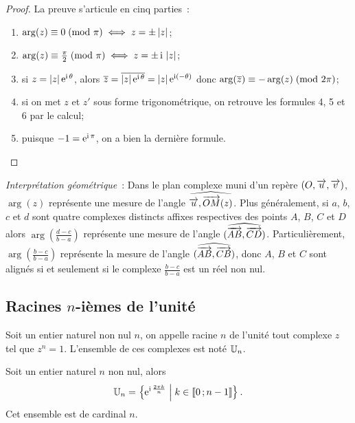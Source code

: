 \begin{proof}
  La preuve s'articule en cinq parties~:
  \begin{enumerate}
    \item \(\arg(z) \equiv 0\!\pmod {\pi} \iff z = \pm \left\lvert z\right\rvert\);
    \item \(\arg(z) \equiv \frac{\pi}{2}\!\pmod {\pi} \iff z = \pm \operatorname{i}{}\left\lvert z\right\rvert\);
    \item si \(z = \left\lvert z\right\rvert \operatorname{e}^{\operatorname{i} \theta}\), alors \(\overline{z} =
      \overline{|z| \operatorname{e}^{\operatorname{i} \theta}} = |z| \operatorname{e}^{\operatorname{i} (-\theta)}\) donc
      \(\arg(\overline{z}) \equiv -\arg(z)\!\pmod {2\pi}\);
    \item si on met \(z\) et \(z'\) sous forme trigonométrique, on retrouve
      les formules 4, 5 et 6 par le calcul;
    \item puisque \(-1 = \operatorname{e}^{\operatorname{i} \pi}\), on a bien la dernière formule.
  \end{enumerate}
\end{proof}

\emph{Interprétation géométrique}~: Dans le plan complexe muni d'un repère
\((O,\overrightarrow{u}, \overrightarrow{v})\), \(\arg(z)\) représente une mesure de l'angle
\(\widehat{\overrightarrow{u}, \overrightarrow{OM}(z)}\). Plus généralement, si \(a\), \(b\), \(c\)
et \(d\) sont quatre complexes distincts affixes respectives des points \(A\),
\(B\), \(C\) et \(D\) alors \(\arg\left(\frac{d-c}{b-a}\right)\) représente une
mesure de l'angle \((\widehat{\overrightarrow{AB},\overrightarrow{CD}})\). Particulièrement,
\(\arg\left(\frac{b-c}{b-a}\right)\) représente la mesure de l'angle
\((\widehat{\overrightarrow{AB},\overrightarrow{CB}})\), donc \(A\), \(B\) et \(C\) sont alignés si
et seulement si le complexe \(\frac{b-c}{b-a}\) est un réel non nul.

\subsection{Racines \(n\)-ièmes de l'unité}\label{subsec:racineunite}

\begin{defdef}
  Soit un entier naturel non nul \(n\), on appelle racine \(n\)\iemes{} de
  l'unité tout complexe \(z\) tel que \(z^n = 1\). L'ensemble de ces complexes
  est noté \(\mathbb{U}_n\).
\end{defdef}

\begin{prop}
  Soit un entier naturel \(n\) non nul, alors
  \begin{equation}
    \mathbb{U}_n = \left\{\operatorname{e}^{\operatorname{i} \frac{2 \pi{} k}{n}}\mathrel{}\middle|\mathrel{}k\in\mathopen{\llbracket}0\mathclose{}\mathpunct{};n-1\mathclose{\rrbracket}\right\}.
  \end{equation}
  Cet ensemble est de cardinal \(n\).
\end{prop}

